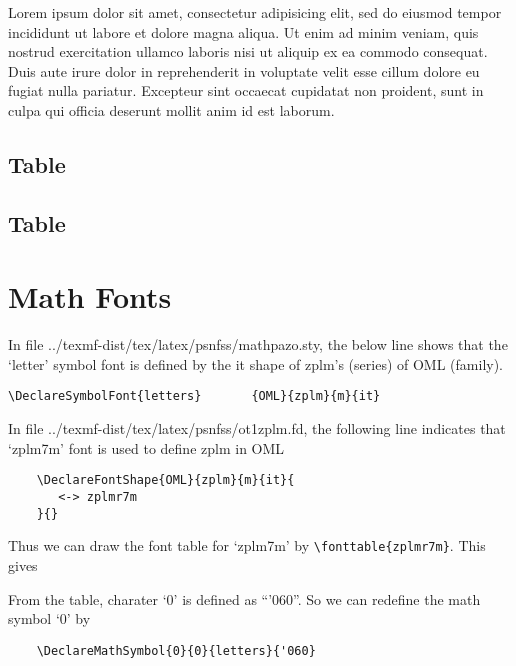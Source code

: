 \documentclass[10pt,a4paper,extrafontsizes,oldfontcommands,oneside]{memoir}
\begin{document}
Lorem ipsum dolor sit amet, consectetur adipisicing elit, sed do eiusmod tempor incididunt ut labore et dolore magna aliqua. Ut enim ad minim veniam, quis nostrud exercitation ullamco laboris nisi ut aliquip ex ea commodo consequat. Duis aute irure dolor in reprehenderit in voluptate velit esse cillum dolore eu fugiat nulla pariatur. Excepteur sint occaecat cupidatat non proident, sunt in culpa qui officia deserunt mollit anim id est laborum.


\subsection{Table} %
\label{sub:table2}

\subsection{Table} %
\label{sub:table3}

\clearpage
\section{Math Fonts}

In file ../texmf-dist/tex/latex/psnfss/mathpazo.sty, the below line shows that the `letter' symbol font is defined by the it shape of zplm's (series) of OML (family).
\begin{verbatim}
\DeclareSymbolFont{letters}       {OML}{zplm}{m}{it}
\end{verbatim}

In file ../texmf-dist/tex/latex/psnfss/ot1zplm.fd, the following line indicates that `zplm7m' font is used to define zplm in OML
\begin{verbatim}
	\DeclareFontShape{OML}{zplm}{m}{it}{
	   <-> zplmr7m
	}{}
\end{verbatim}

Thus we can draw the font table for `zplm7m' by \verb+\fonttable{zplmr7m}+. This gives

From the table, charater `0' is defined as ``'060''. So we can redefine the math symbol `0' by
\begin{verbatim}
	\DeclareMathSymbol{0}{0}{letters}{'060}
\end{verbatim}

\clearpage
\end{document}
